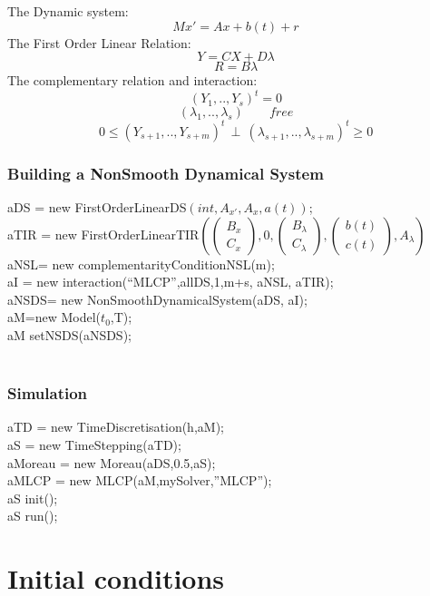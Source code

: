 The Dynamic system:
\[Mx'=Ax +b(t)+r\]
The First Order Linear Relation:
\[Y=CX +D \lambda\]
\[R=B \lambda\]
The complementary relation and interaction:
\[(Y_{1},..,Y_{s})^{t}=0\]
\[(\lambda_{1},..,\lambda_{s}) \qquad free\]
\[0 \leq (Y_{s+1},..,Y_{s+m})^{t} \, \perp \, (\lambda_{s+1},..,\lambda_{s+m})^{t} \geq 0\]

\subsubsection{Building a NonSmooth Dynamical System}
 
 aDS = new FirstOrderLinearDS$(int,A_{x'},A_{x},a(t))$;\\
 aTIR = new FirstOrderLinearTIR$(\left(\begin{array}{c}B_{x}\\C_{x}
 \end{array}\right),0,\left(\begin{array}{c}B_{\lambda}\\C_{\lambda}
 \end{array}\right),\left(\begin{array}{c}b(t)\\c(t) \end{array}\right),A_{\lambda})$\\

 aNSL= new complementarityConditionNSL(m);\\
 aI = new interaction(``MLCP'',allDS,1,m+s, aNSL, aTIR);\\
 aNSDS= new NonSmoothDynamicalSystem(aDS, aI);\\
 aM=new Model($t_{0}$,T);\\
 aM setNSDS(aNSDS);\\
\\
\subsubsection{Simulation}
aTD = new TimeDiscretisation(h,aM);\\
aS = new TimeStepping(aTD);\\
aMoreau = new Moreau(aDS,0.5,aS);\\
aMLCP = new MLCP(aM,mySolver,''MLCP'');\\
aS init();\\
aS run();\\
\newpage

\section{Initial conditions}
